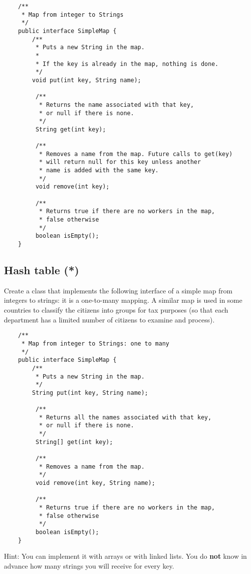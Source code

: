 \documentclass{article}
\begin{document}
\begin{verbatim}
    /**
     * Map from integer to Strings
     */
    public interface SimpleMap {
        /**
         * Puts a new String in the map. 
         * 
         * If the key is already in the map, nothing is done.
         */
        void put(int key, String name);
    
         /**
          * Returns the name associated with that key, 
          * or null if there is none.
          */
         String get(int key);
    
         /**
          * Removes a name from the map. Future calls to get(key) 
          * will return null for this key unless another 
          * name is added with the same key.
          */
         void remove(int key);
    
         /** 
          * Returns true if there are no workers in the map, 
          * false otherwise
          */
         boolean isEmpty();
    }
\end{verbatim}


\subsection{Hash table (*)}
\label{sec:simple-map-2}

Create a class that implements the following interface of a simple map
from integers to strings: it is a one-to-many mapping. 
A similar map is used in some countries to
classify the citizens into groups for tax purposes (so that each
department has a limited number of citizens to examine and process). 

\begin{verbatim}
    /**
     * Map from integer to Strings: one to many
     */
    public interface SimpleMap {
        /**
         * Puts a new String in the map. 
         */
        String put(int key, String name);
    
         /**
          * Returns all the names associated with that key, 
          * or null if there is none.
          */
         String[] get(int key);
    
         /**
          * Removes a name from the map.
          */
         void remove(int key, String name);
    
         /** 
          * Returns true if there are no workers in the map, 
          * false otherwise
          */
         boolean isEmpty();
    }
\end{verbatim}

Hint: You can implement it with arrays or with linked lists. You do
\textbf{not} know in advance how many strings you will receive for
every key.  
\end{document}
